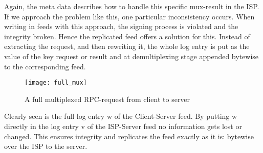 Again, the meta data describes how to handle this specific mux-result in the ISP. If we approach the problem like this, one particular inconsistency occurs. When writing in feeds with this approach, the signing process is violated and the integrity broken. Hence the replicated feed offers a solution for this. Instead of extracting the request, and then rewriting it, the whole log entry is put as the value of the key request or result and at demultiplexing stage appended bytewise to the corresponding feed.
\begin{figure}
    \centering
    \texttt{[image: full\_mux]}
    \caption{A full multiplexed RPC-request from client to server}
    \label{fig:fullmux}
\end{figure}
Clearly seen is the full log entry w of the Client-Server feed. By putting w directly in the log entry v of the ISP-Server feed no information gets lost or changed. This ensures integrity and replicates the feed exactly as it is: bytewise over the ISP to the server.
